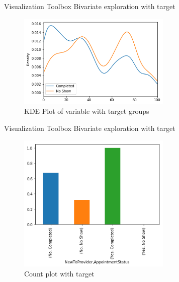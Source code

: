 \documentclass[10pt]{beamer}
\begin{document}
\begin{frame}{Visualization Toolbox}
Bivariate exploration with target 
	\begin{figure}	
		\caption{KDE Plot of variable with target groups}
		\includegraphics[width=0.65\textwidth, center, trim=0cm 0cm 0 0cm]{images/kde_age_target.png}
	\end{figure}
\end{frame}

\begin{frame}{Visualization Toolbox}
Bivariate exploration with target 
	\begin{figure}	
		\caption{Count plot with target}
		\includegraphics[width=0.65\textwidth, center, trim=0cm 0cm 0 0cm]{images/count_bar_NewToProv_target.png}
	\end{figure}
\end{frame}
\end{document}
